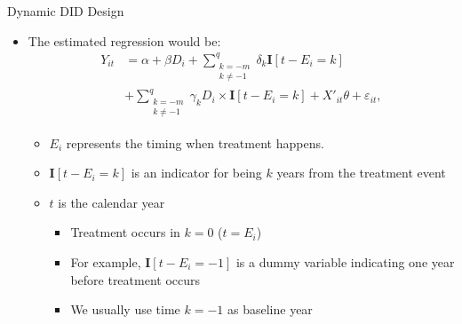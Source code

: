 \documentclass[dvipsnames,hyperref={pdfpagelabels=false}]{beamer}
\begin{document}
\begin{frame}{Dynamic DID Design}
	\begin{itemize}
		\item The estimated regression would be:
		\begin{align*}
		Y_{it}&=\alpha + \beta D_{i} + \sum^{q}_{\substack{k=-m\\k\neq-1}}\delta_{k} \mathbf{I}[t-E_{i}=k]  \\
		&+ \sum^{q}_{\substack{k=-m\\k\neq-1}}\gamma_{k} D_{i} \times \mathbf{I}[t-E_{i}=k]
		+X'_{it}\theta+\varepsilon_{it},
		\end{align*}
		\begin{itemize}
			\item  $E_{i}$ represents the timing when treatment happens.
			\vspace{0.2cm}
			\item $\mathbf{I}[t-E_{i}=k]$ is an indicator for being $k$ years from the treatment event
						\vspace{0.2cm}
			\item $t$ is the calendar year
						\vspace{0.2cm}
				\begin{itemize}			
			\item Treatment occurs in $k=0$ ($t=E_{i}$)
			\vspace{0.2cm}
			\item For example, $\mathbf{I}[t-E_{i}=-1]$ is a dummy variable indicating one year before treatment occurs
					\vspace{0.2cm}
			\item We usually use time $k=-1$ as baseline year
			
					\end{itemize}
					
		\end{itemize}
	\end{itemize}
\end{frame}
\end{document}
